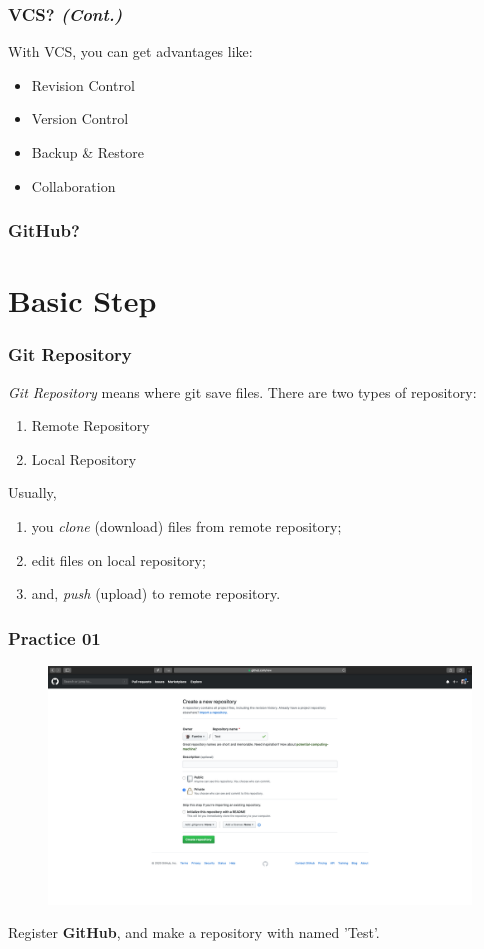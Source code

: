 \documentclass[aspectratio=169]{beamer}
\begin{document}
	\begin{frame}
		\frametitle{VCS? \textit{(Cont.)}}
		
		With VCS, you can get advantages like:
		\begin{itemize}
			\item Revision Control
			\item Version Control
			\item Backup \& Restore
			\item Collaboration
		\end{itemize}
	\end{frame}

	\begin{frame}
		\frametitle{GitHub?}
	\end{frame}

	\section{Basic Step}
	\begin{frame}
		\frametitle{Git Repository}
		
		\textit{Git Repository} means where git save files. There are two types of repository:
		\begin{enumerate}
			\item Remote Repository
			\item Local Repository
		\end{enumerate}
	
		Usually, 
		\begin{enumerate}
			\item you \textit{clone} (download) files from remote repository;
			\item edit files on local repository;
			\item and, \textit{push} (upload) to remote repository.
		\end{enumerate}
	\end{frame}

	\begin{frame}
		\frametitle{Practice 01}
		
		\begin{figure}
			\centering
			\includegraphics[width=0.6 \linewidth]{figures/1.png}
		\end{figure}
	
		Register \textbf{GitHub}, and make a repository with named 'Test'.
	\end{frame}
\end{document}
